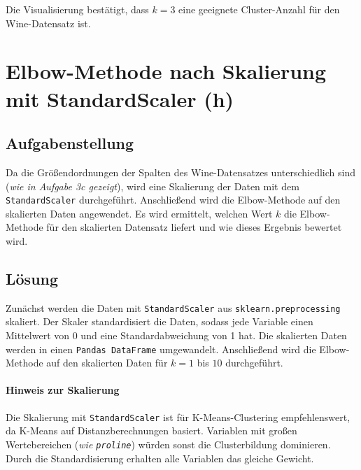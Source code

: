 Die Visualisierung bestätigt, dass \(k = 3\) eine geeignete Cluster-Anzahl für den Wine-Datensatz ist.

\cleardoublepage


\section{Elbow-Methode nach Skalierung mit StandardScaler (h)}
\label{sec:3h}

\subsection{Aufgabenstellung}

Da die Größendordnungen der Spalten des Wine-Datensatzes unterschiedlich sind (\textit{wie in Aufgabe 3c gezeigt}), wird eine Skalierung der Daten mit dem \texttt{StandardScaler} durchgeführt. Anschließend wird die Elbow-Methode auf den skalierten Daten angewendet. Es wird ermittelt, welchen Wert \(k\) die Elbow-Methode für den skalierten Datensatz liefert und wie dieses Ergebnis bewertet wird.

\subsection{Lösung}

Zunächst werden die Daten mit \texttt{StandardScaler} aus \texttt{sklearn.preprocessing} skaliert. Der Skaler standardisiert die Daten, sodass jede Variable einen Mittelwert von 0 und eine Standardabweichung von 1 hat. Die skalierten Daten werden in einen \texttt{Pandas DataFrame} umgewandelt. Anschließend wird die Elbow-Methode auf den skalierten Daten für \(k = 1\) bis \(10\) durchgeführt.



\paragraph{\textbf{Hinweis zur Skalierung}}

Die Skalierung mit \texttt{StandardScaler} ist für K-Means-Clustering empfehlenswert, da K-Means auf Distanzberechnungen basiert. Variablen mit großen Wertebereichen (\textit{wie \texttt{proline}}) würden sonst die Clusterbildung dominieren. Durch die Standardisierung erhalten alle Variablen das gleiche Gewicht.

